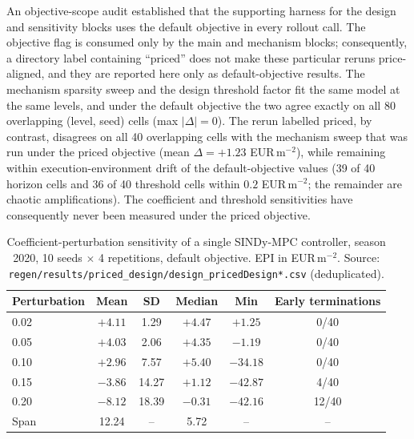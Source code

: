 An objective-scope audit established that the supporting harness for the design and
sensitivity blocks uses the default objective in every rollout call. The objective flag is
consumed only by the main and mechanism blocks; consequently, a directory label containing
``priced'' does not make these particular reruns price-aligned, and they are reported here
only as default-objective results. The mechanism sparsity sweep and the design threshold factor fit the same
model at the same levels, and under the default objective the two agree exactly on all 80
overlapping (level, seed) cells (max $|\Delta| = 0$). The rerun labelled priced, by
contrast, disagrees on all 40 overlapping cells with the mechanism sweep that was run under
the priced objective (mean $\Delta = +1.23$ EUR\,m$^{-2}$), while remaining within
execution-environment drift of the default-objective values (39 of 40 horizon cells and 36
of 40 threshold cells within $0.2$ EUR\,m$^{-2}$; the remainder are chaotic
amplifications). The coefficient and
threshold sensitivities have consequently never been measured under the priced objective.

\begin{table}[t]
\centering
\caption{Coefficient-perturbation sensitivity of a single SINDy-MPC controller, season
2020, 10 seeds $\times$ 4 repetitions, default objective. EPI in EUR\,m$^{-2}$. Source:
\texttt{regen/results/priced\_design/design\_pricedDesign*.csv} (deduplicated).}
\label{tab:sens}
\small
\begin{tabular}{@{}lccccc@{}}
\toprule
Perturbation & Mean & SD & Median & Min & Early terminations \\
\midrule
0.02 & $+4.11$ & 1.29  & $+4.47$ & $+1.25$  & 0/40 \\
0.05 & $+4.03$ & 2.06  & $+4.35$ & $-1.19$  & 0/40 \\
0.10 & $+2.96$ & 7.57  & $+5.40$ & $-34.18$ & 0/40 \\
0.15 & $-3.86$ & 14.27 & $+1.12$ & $-42.87$ & 4/40 \\
0.20 & $-8.12$ & 18.39 & $-0.31$ & $-42.16$ & 12/40 \\
\midrule
Span & 12.24 & -- & 5.72 & -- & -- \\
\bottomrule
\end{tabular}
\end{table}

